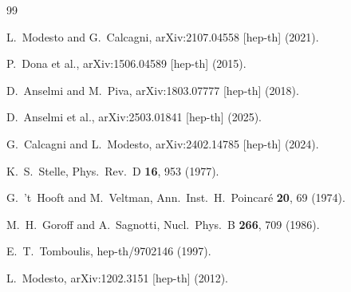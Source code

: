 \documentclass[11pt,a4paper]{article}
\theoremstyle{remark}
\begin{document}
\begin{thebibliography}{99}

  L.~Modesto and G.~Calcagni,
  arXiv:2107.04558 [hep-th] (2021).

  P.~Dona et al.,
  arXiv:1506.04589 [hep-th] (2015).

  D.~Anselmi and M.~Piva,
  arXiv:1803.07777 [hep-th] (2018).

  D.~Anselmi et al.,
  arXiv:2503.01841 [hep-th] (2025).

  G.~Calcagni and L.~Modesto,
  arXiv:2402.14785 [hep-th] (2024).

  K.~S.~Stelle,
  Phys.\ Rev.\ D \textbf{16}, 953 (1977).

  G.~'t~Hooft and M.~Veltman,
  Ann.\ Inst.\ H.\ Poincar\'e \textbf{20}, 69 (1974).

  M.~H.~Goroff and A.~Sagnotti,
  Nucl.\ Phys.\ B \textbf{266}, 709 (1986).

  E.~T.~Tomboulis,
  hep-th/9702146 (1997).

  L.~Modesto,
  arXiv:1202.3151 [hep-th] (2012).

\end{thebibliography}
\end{document}
